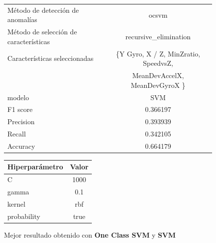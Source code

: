 \begin{appendices}
		\begin{figure}[htb]
			\centering
			\caption{Mejor resultado obtenido con \textbf{One Class SVM} y \textbf{SVM}}
			\label{table:28}
			\begin{tabular}{lc}
				\toprule
					  Método de detección de anomalías &                                              ocsvm \\
				Método de selección de características &                              recursive\_elimination \\
						 Características seleccionadas & \{Y Gyro, X / Z, MinZratio, SpeedvsZ,   \\ 
						 							   &   MeanDevAccelX, MeanDevGyroX \}\\
												modelo &                                                SVM \\
											  F1 score &                                           0.366197 \\
											 Precision &                                           0.393939 \\
												Recall &                                           0.342105 \\
											  Accuracy &                                           0.664179 \\
				\bottomrule
			\end{tabular}
			\newline
			\newline

			\begin{tabular}{lc}
				\toprule
				Hiperparámetro & Valor \\
				\midrule
							 C &  1000 \\
						 gamma &   0.1 \\
						kernel &   rbf \\
				   probability &  true \\
				\bottomrule
			\end{tabular}
			
		\end{figure}


\end{appendices}
